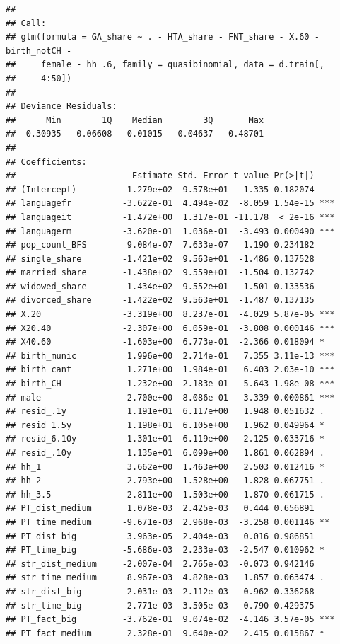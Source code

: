 \documentclass[
]{article}
\begin{document}
\begin{verbatim}
## 
## Call:
## glm(formula = GA_share ~ . - HTA_share - FNT_share - X.60 - birth_notCH - 
##     female - hh_.6, family = quasibinomial, data = d.train[, 
##     4:50])
## 
## Deviance Residuals: 
##      Min        1Q    Median        3Q       Max  
## -0.30935  -0.06608  -0.01015   0.04637   0.48701  
## 
## Coefficients:
##                       Estimate Std. Error t value Pr(>|t|)    
## (Intercept)          1.279e+02  9.578e+01   1.335 0.182074    
## languagefr          -3.622e-01  4.494e-02  -8.059 1.54e-15 ***
## languageit          -1.472e+00  1.317e-01 -11.178  < 2e-16 ***
## languagerm          -3.620e-01  1.036e-01  -3.493 0.000490 ***
## pop_count_BFS        9.084e-07  7.633e-07   1.190 0.234182    
## single_share        -1.421e+02  9.563e+01  -1.486 0.137528    
## married_share       -1.438e+02  9.559e+01  -1.504 0.132742    
## widowed_share       -1.434e+02  9.552e+01  -1.501 0.133536    
## divorced_share      -1.422e+02  9.563e+01  -1.487 0.137135    
## X.20                -3.319e+00  8.237e-01  -4.029 5.87e-05 ***
## X20.40              -2.307e+00  6.059e-01  -3.808 0.000146 ***
## X40.60              -1.603e+00  6.773e-01  -2.366 0.018094 *  
## birth_munic          1.996e+00  2.714e-01   7.355 3.11e-13 ***
## birth_cant           1.271e+00  1.984e-01   6.403 2.03e-10 ***
## birth_CH             1.232e+00  2.183e-01   5.643 1.98e-08 ***
## male                -2.700e+00  8.086e-01  -3.339 0.000861 ***
## resid_.1y            1.191e+01  6.117e+00   1.948 0.051632 .  
## resid_1.5y           1.198e+01  6.105e+00   1.962 0.049964 *  
## resid_6.10y          1.301e+01  6.119e+00   2.125 0.033716 *  
## resid_.10y           1.135e+01  6.099e+00   1.861 0.062894 .  
## hh_1                 3.662e+00  1.463e+00   2.503 0.012416 *  
## hh_2                 2.793e+00  1.528e+00   1.828 0.067751 .  
## hh_3.5               2.811e+00  1.503e+00   1.870 0.061715 .  
## PT_dist_medium       1.078e-03  2.425e-03   0.444 0.656891    
## PT_time_medium      -9.671e-03  2.968e-03  -3.258 0.001146 ** 
## PT_dist_big          3.963e-05  2.404e-03   0.016 0.986851    
## PT_time_big         -5.686e-03  2.233e-03  -2.547 0.010962 *  
## str_dist_medium     -2.007e-04  2.765e-03  -0.073 0.942146    
## str_time_medium      8.967e-03  4.828e-03   1.857 0.063474 .  
## str_dist_big         2.031e-03  2.112e-03   0.962 0.336268    
## str_time_big         2.771e-03  3.505e-03   0.790 0.429375    
## PT_fact_big         -3.762e-01  9.074e-02  -4.146 3.57e-05 ***
## PT_fact_medium       2.328e-01  9.640e-02   2.415 0.015867 *  

\end{verbatim}
\end{document}
